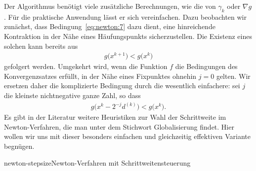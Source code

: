 \begin{remark}
  Der Algorithmus benötigt viele zusätzliche Berechnungen, wie die von
  $\gamma_k$ oder $\nabla g$. Für die praktische Anwendung lässt er
  sich vereinfachen. Dazu beobachten wir zunächst, dass
  Bedingung~\eqref{eq:newton:7} dazu dient, eine hinreichende
  Kontraktion in der Nähe eines Häufungspunkts sicherzustellen. Die
  Existenz eines solchen kann bereits aus
  \begin{gather}
    g\bigl(x^{k+1}\bigr) < g\bigl(x^{k}\bigr)
  \end{gather}
  gefolgert werden. Umgekehrt wird, wenn die Funktion $f$ die
  Bedingungen des Konvergenzsatzes 
  erfüllt, in der Nähe eines Fixpunktes ohnehin $j=0$ gelten. Wir
  ersetzen daher die komplizierte Bedingung durch die wesentlich
  einfachere: sei $j$ die kleinste nichtnegative ganze Zahl, so dass
  \begin{gather}
    g\bigl(x^{k} - 2^{-j} d^{(k)}\bigr) < g\bigl(x^{k}\bigr).
  \end{gather}
  Es gibt in der Literatur weitere Heuristiken zur Wahl der
  Schrittweite im Newton-Verfahren, die man unter dem Stichwort \glqq
  Globalisierung\grqq{} findet. Hier wollen wir uns mit dieser
  besonders einfachen und gleichzeitig effektiven Variante begnügen.
\end{remark}

\begin{Algorithmus*}{newton-stepsize}{Newton-Verfahren mit Schrittweitensteuerung}
  
\end{Algorithmus*}

